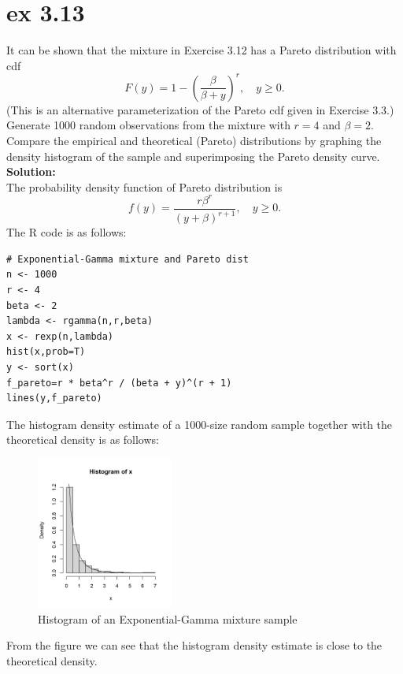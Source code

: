\documentclass[UTF8]{ctexart}
\begin{document}
\section{ex 3.13}
It can be shown that the mixture in Exercise 3.12 has a Pareto distribution
with cdf
\begin{equation*}
    F (y) = 1 - \left(\frac{\beta}{\beta+y}\right)^{r}, \quad y \geq 0.
\end{equation*}
(This is an alternative parameterization of the Pareto cdf given in Exercise
3.3.) Generate 1000 random observations from the mixture with $r = 4$ and
$\beta = 2$. Compare the empirical and theoretical (Pareto) distributions by graphing
the density histogram of the sample and superimposing the Pareto density curve.\\
\textbf{Solution:}\\
The probability density function of Pareto distribution is
\begin{equation*}
    f(y) = \frac{r\beta^{r}}{(y+\beta)^{r+1}}, \quad y \geq 0.
\end{equation*}
The R code is as follows:
\begin{lstlisting}
# Exponential-Gamma mixture and Pareto dist
n <- 1000
r <- 4
beta <- 2
lambda <- rgamma(n,r,beta)
x <- rexp(n,lambda)
hist(x,prob=T)
y <- sort(x)
f_pareto=r * beta^r / (beta + y)^(r + 1)
lines(y,f_pareto)
\end{lstlisting}
The histogram density estimate of a 1000-size random sample together with the theoretical density is as follows:
\begin{figure}[H]
    \centering
    \includegraphics[width=0.4\textwidth]{ex3-13.png}
    \caption{Histogram of an Exponential-Gamma mixture sample}
\end{figure}
From the figure we can see that the histogram density estimate is close to the theoretical density.
\end{document}
